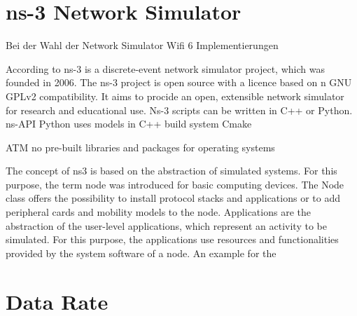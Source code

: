 \documentclass[]{nsm-thesis}
\begin{document}
 
\section{ns-3 Network Simulator}

Bei der Wahl der Network Simulator Wifi 6 Implementierungen 



According to \cite{ns3manual} ns-3 is a discrete-event network simulator project, which was founded in 2006. The ns-3 project is open source with a licence based on n GNU GPLv2 compatibility. It aims to procide an open, extensible network simulator for research and educational use. Ns-3 scripts can be written in C++ or Python.
ns-API Python uses models in C++
build system Cmake

ATM no pre-built libraries and packages for operating systems
 
The concept of ns3 is based on the abstraction of simulated systems. For this purpose, the term node was introduced for basic computing devices. The Node class offers the possibility to install protocol stacks and applications or to add peripheral cards and mobility models to the node.
Applications are the abstraction of the user-level applications, which represent an activity to be simulated. For this purpose, the applications use resources and functionalities provided by the system software of a node. An example for the 


\section{Data Rate}
\end{document}
